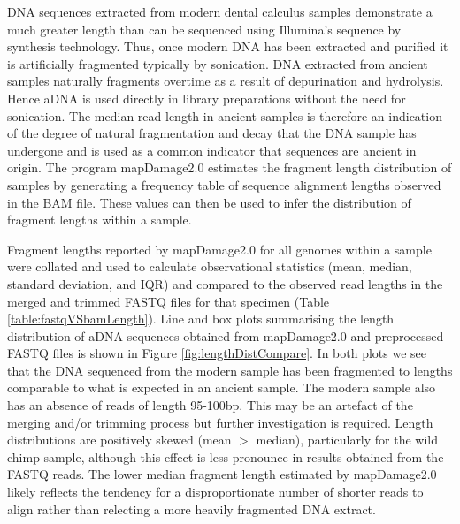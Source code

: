\documentclass[12pt, a4paper]{article}
\begin{document}
DNA sequences extracted from modern dental calculus samples demonstrate a much greater length than can be sequenced using Illumina's sequence by synthesis technology. 
Thus, once modern DNA has been extracted and purified it is artificially fragmented typically by sonication. 
DNA extracted from ancient samples naturally fragments overtime as a result of depurination and hydrolysis.
Hence aDNA is used directly in library preparations without the need for sonication. 
The median read length in ancient samples is therefore an indication of the degree of natural fragmentation and decay that the DNA sample has undergone and is used as a common indicator that sequences are ancient in origin. 
The program mapDamage2.0 estimates the fragment length distribution of samples by generating a frequency table of sequence alignment lengths observed in the BAM file. 
These values can then be used to infer the distribution of fragment lengths within a sample. 

Fragment lengths reported by mapDamage2.0 for all genomes within a sample were collated and used to calculate observational statistics (mean, median, standard deviation, and IQR) and compared to the observed read lengths in the merged and trimmed FASTQ files for that specimen (Table \ref{table:fastqVSbamLength}). 
Line and box plots summarising the length distribution of aDNA sequences obtained from mapDamage2.0 and preprocessed FASTQ files is shown in Figure \ref{fig:lengthDistCompare}.
In both plots we see that the DNA sequenced from the modern sample has been fragmented to lengths comparable to what is expected in an ancient sample.
The modern sample also has an absence of reads of length 95-100bp.
This may be an artefact of the merging and/or trimming process but further investigation is required.
Length distributions are positively skewed (mean $>$ median), particularly for the wild chimp sample, although this effect is less pronounce in results obtained from the FASTQ reads. 
The lower median fragment length estimated by mapDamage2.0 likely reflects the tendency for a disproportionate number of shorter reads to align rather than relecting a more heavily fragmented DNA extract. 
\end{document}
